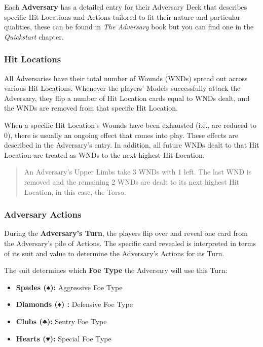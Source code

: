 \documentclass[
]{book}
\providecommand{\tightlist}{%
  \setlength{\itemsep}{0pt}\setlength{\parskip}{0pt}}
\begin{document}
Each \textbf{Adversary} has a detailed entry for their Adversary Deck that describes specific Hit Locations and Actions tailored to fit their nature and particular qualities, these can be found in \emph{The Adversary} book but you can find one in the \emph{Quickstart} chapter.

\hypertarget{hit-locations}{%
\subsubsection*{Hit Locations}\label{hit-locations}}

All Adversaries have their total number of Wounds (WNDs) spread out across various Hit Locations. Whenever the players' Models successfully attack the Adversary, they flip a number of Hit Location cards equal to WNDs dealt, and the WNDs are removed from that specific Hit Location.  

When a specific Hit Location's Wounds have been exhausted (i.e., are reduced to 0), there is usually an ongoing effect that comes into play. These effects are described in the Adversary's entry. In addition, all future WNDs dealt to that Hit Location are treated as WNDs to the next highest Hit Location.

\begin{quote}
An Adversary's Upper Limbs take 3 WNDs with 1 left. The last WND is removed and the remaining 2 WNDs are dealt to its next highest Hit Location, in this case, the Torso.
\end{quote}

\hypertarget{adversary-actions}{%
\subsubsection*{Adversary Actions}\label{adversary-actions}}

During the \textbf{Adversary's Turn}, the players flip over and reveal one card from the Adversary's pile of Actions. The specific card revealed is interpreted in terms of its suit and value to determine the Adversary's Actions for its Turn.

The suit determines which \textbf{Foe Type} the Adversary will use this Turn:

\begin{itemize}
\tightlist
\item
  \textbf{Spades (♠):} Aggressive Foe Type
\item
  \textbf{Diamonds (♦) :} Defensive Foe Type
\item
  \textbf{Clubs (♣):} Sentry Foe Type
\item
  \textbf{Hearts (♥):} Special Foe Type
\end{itemize}
\end{document}
